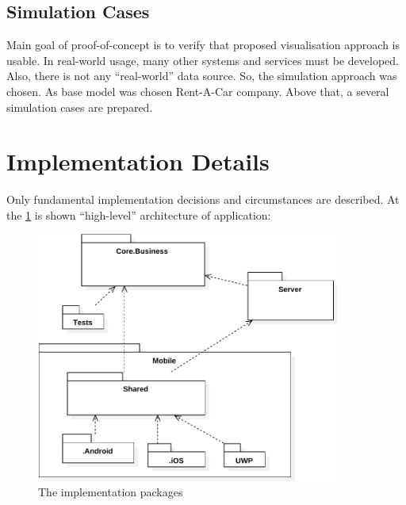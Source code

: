 \subsection{Simulation Cases}
Main goal of proof-of-concept is to verify that proposed visualisation approach is usable. In real-world usage, many other systems and services must be developed. Also, there is not any ``real-world'' data source. So, the simulation approach was chosen. As base model was chosen Rent-A-Car company. Above that, a several simulation cases are prepared. 
\section{Implementation Details}
Only fundamental implementation decisions and circumstances are described. At the \cref{fig:impl-dependecies-graph} is shown ``high-level'' architecture of application:

\begin{figure}[ht!]
\centering
\includegraphics[width=10cm,keepaspectratio]{img/dependecies-graph}
\caption{The implementation packages}
\label{fig:impl-dependecies-graph}
\end{figure}

